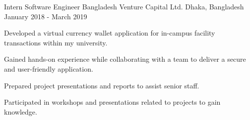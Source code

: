 \begin{cventries}
\end{cventries}



\begin{cventries}

    \cventry
        {Intern Software Engineer}
        {Bangladesh Venture Capital Ltd.}
        {Dhaka, Bangladesh}
        {January 2018 - March 2019}
        {
            \begin{cvitems}
                \item {Developed a virtual currency wallet application for in-campus facility transactions within my university.}
                \item {Gained hands-on experience while collaborating with a team to deliver a secure and user-friendly application.}
                \item {Prepared project presentations and reports to assist senior staff.}
                \item {Participated in workshops and presentations related to projects to gain knowledge.}
            \end{cvitems}
        }

\end{cventries}
